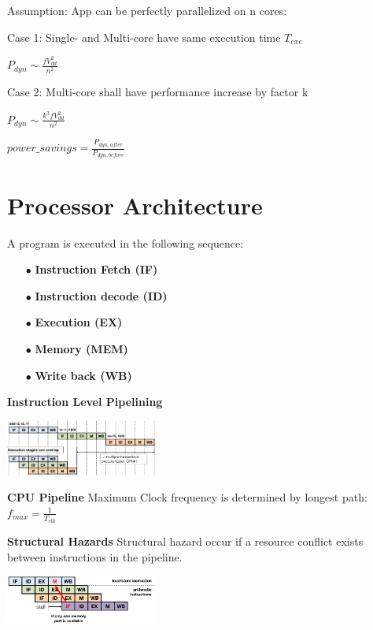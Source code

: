 \documentclass[english]{latex4ei/latex4ei_sheet}
\begin{document}
Assumption: App can be perfectly parallelized on n cores:

Case 1: Single- and Multi-core have same execution time $T_{exe}$

$P_{dyn} \sim \frac{f V_{dd}^2}{n^2}$

Case 2: Multi-core shall have performance increase by factor k

$P_{dyn} \sim \frac{k^3 f V_{dd}^2}{n^2}$

$power\_savings = \frac{P_{dyn, after}}{P_{dyn, before}}$

\section{Processor Architecture}

A program is executed in the following sequence:
\begin{enumerate}
	\item[$\bullet$] \textbf{Instruction Fetch (IF)}
	\item[$\bullet$] \textbf{Instruction decode (ID)}
	\item[$\bullet$] \textbf{Execution (EX)}
	\item[$\bullet$] \textbf{Memory (MEM)}
	\item[$\bullet$] \textbf{Write back (WB)}
\end{enumerate}

\textbf{Instruction Level Pipelining}
\begin{center}
	\includegraphics[width = 5cm]{images/4.ProcessorArchitecture/ILP.png}
\end{center}

\textbf{CPU Pipeline} Maximum Clock frequency is determined by longest path: $f_{max} = \frac{1}{T_{clk}}$

\textbf{Structural Hazards} Structural hazard occur if a resource conflict exists between instructions in the pipeline.
\begin{center}
	\includegraphics[width = 5cm]{images/4.ProcessorArchitecture/StrHazard.png}
\end{center}
\end{document}
